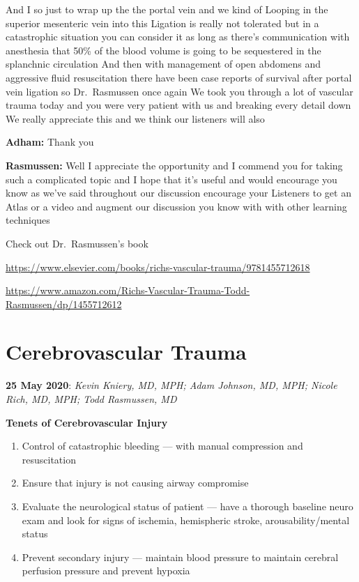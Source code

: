 \documentclass[
]{book}
\providecommand{\tightlist}{%
  \setlength{\itemsep}{0pt}\setlength{\parskip}{0pt}}
\begin{document}
And I so just to wrap up the the portal vein and we kind of Looping in the superior mesenteric vein into this Ligation is really not tolerated but in a catastrophic situation you can consider it as long as there's communication with anesthesia that 50\% of the blood volume is going to be sequestered in the splanchnic circulation And then with management of open abdomens and aggressive fluid resuscitation there have been case reports of survival after portal vein ligation so Dr.~Rasmussen once again We took you through a lot of vascular trauma today and you were very patient with us and breaking every detail down We really appreciate this and we think our listeners will also

\textbf{Adham:} Thank you

\textbf{Rasmussen:} Well I appreciate the opportunity and I commend you for taking such a complicated topic and I hope that it's useful and would encourage you know as we've said throughout our discussion encourage your Listeners to get an Atlas or a video and augment our discussion you know with with other learning techniques

Check out Dr.~Rasmussen's book

\url{https://www.elsevier.com/books/richs-vascular-trauma/9781455712618}

\url{https://www.amazon.com/Richs-Vascular-Trauma-Todd-Rasmussen/dp/1455712612}

\hypertarget{cerebrovascular-trauma}{%
\section{Cerebrovascular Trauma}\label{cerebrovascular-trauma}}

\textbf{25 May 2020}: \emph{Kevin Kniery, MD, MPH; Adam Johnson, MD, MPH; Nicole
Rich, MD, MPH; Todd Rasmussen, MD}

\textbf{Tenets of Cerebrovascular Injury}

\begin{enumerate}
\def\labelenumi{\arabic{enumi}.}
\tightlist
\item
  Control of catastrophic bleeding --- with manual compression and resuscitation
\item
  Ensure that injury is not causing airway compromise
\item
  Evaluate the neurological status of patient --- have a thorough baseline neuro exam and look for signs of ischemia, hemispheric stroke, arousability/mental status
\item
  Prevent secondary injury --- maintain blood pressure to maintain cerebral perfusion pressure and prevent hypoxia
\end{enumerate}
\end{document}

